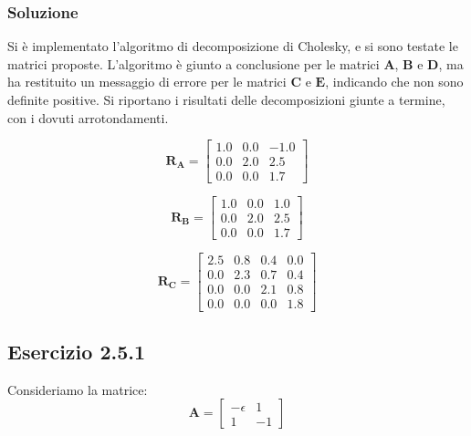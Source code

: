 \documentclass[letterpaper, 12pt]{article}
\begin{document}
\subsubsection{Soluzione}
Si è implementato l'algoritmo di decomposizione di Cholesky, e si sono testate le matrici proposte. L'algoritmo
è giunto a conclusione per le matrici $\mathbf{A}$, $\mathbf{B}$ e $\mathbf{D}$, ma ha restituito un messaggio di
errore per le matrici $\mathbf{C}$ e $\mathbf{E}$, indicando che non sono definite positive. 
Si riportano i risultati delle decomposizioni giunte a termine, con i dovuti arrotondamenti. 

\begin{center}
    \begin{minipage}{0.32\textwidth}
    \centering
    \[
    \mathbf{R_A} =
    \begin{bmatrix}
        1.0  &  0.0  &  -1.0 \\
        0.0  &  2.0  &  2.5 \\
        0.0  &  0.0  &  1.7
    \end{bmatrix}
    \]
    \end{minipage}
    \hfill
    \begin{minipage}{0.32\textwidth}
    \centering
    \[
    \mathbf{R_B} =
    \begin{bmatrix}
    1.0  &  0.0  &  1.0 \\
    0.0  &  2.0  &  2.5 \\
    0.0  &  0.0  &  1.7
    \end{bmatrix}
    \]
    \end{minipage}
    \hfill
    \begin{minipage}{0.32\textwidth}
    \centering
    \[
    \mathbf{R_C} =
    \begin{bmatrix}
    2.5  &  0.8 &  0.4  &  0.0 \\
    0.0  &  2.3 &  0.7  &  0.4 \\
    0.0  &  0.0 &  2.1  &  0.8 \\
    0.0  &  0.0 &  0.0  &  1.8
    \end{bmatrix}
    \]
    \end{minipage}
\end{center}

\subsection{Esercizio 2.5.1}
Consideriamo la matrice:
\[
\mathbf{A} =
\begin{bmatrix}
-\epsilon &  1 \\
        1 & -1
\end{bmatrix}
\]
\end{document}
